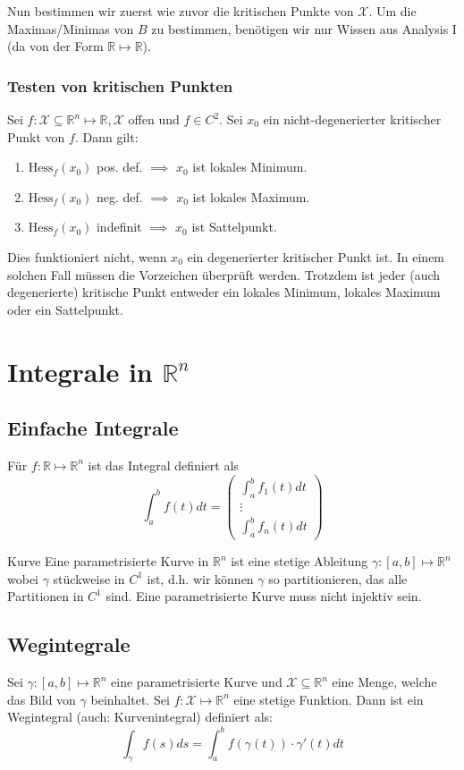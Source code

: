\documentclass[a4paper,10pt]{article}
\def\R{\mathbb{R}}
\def\X{\mathcal{X}}
\begin{document}
Nun bestimmen wir zuerst wie zuvor die kritischen Punkte von \(\X\). Um die Maximas/Minimas von \(B\) zu bestimmen, benötigen wir nur Wissen aus Analysis I (da von der Form \(\R \mapsto \R\)).
\subsubsection*{Testen von kritischen Punkten}
Sei \(f: \X \subseteq \R^n \mapsto \R, \X\) offen und \(f\in C^2\). Sei \(x_0\) ein nicht-degenerierter kritischer Punkt von \(f\). Dann gilt:
\begin{enumerate}
  \item $\text{Hess}_f(x_0)$ pos. def. \(\implies\) $x_0$ ist lokales Minimum.
  \item $\text{Hess}_f(x_0)$ neg. def. \(\implies\) $x_0$ ist lokales Maximum.
  \item $\text{Hess}_f(x_0)$ indefinit \(\implies\) $x_0$ ist Sattelpunkt.
\end{enumerate}
Dies funktioniert nicht, wenn \(x_0\) ein degenerierter kritischer Punkt ist. In einem solchen Fall müssen die Vorzeichen überprüft werden. Trotzdem ist jeder (auch degenerierte) kritische Punkt entweder ein lokales Minimum, lokales Maximum oder ein Sattelpunkt.

\section{Integrale in \texorpdfstring{\(\R^n\)}{Rⁿ}}
\subsection{Einfache Integrale}
Für \(f: \R \mapsto \R^n\) ist das Integral definiert als
\[\int_a^b f(t)dt = 
\begin{pmatrix*}
  \int_a^b f_1(t) dt \\
  \vdots\\
  \int_a^b f_n(t) dt
\end{pmatrix*}
\]

\begin{mainbox}{Kurve}
  Eine parametrisierte Kurve in \(\R^n\) ist eine stetige Ableitung \(\gamma: \left[a,b\right] \mapsto \R^n\) wobei \(\gamma\) stückweise in \(C^1\) ist, d.h. wir können \(\gamma\) so partitionieren, das alle Partitionen in \(C^1\) sind. Eine parametrisierte Kurve muss nicht injektiv sein.
\end{mainbox}
\subsection{Wegintegrale}
Sei \(\gamma : \left[a,b\right] \mapsto \R^n\) eine parametrisierte Kurve und \(\X \subseteq \R^n\) eine Menge, welche das Bild von \(\gamma\) beinhaltet. Sei \(f : \X \mapsto \R^n\) eine stetige Funktion. Dann ist ein Wegintegral (auch: Kurvenintegral) definiert als:
\[\int_\gamma f(s) ds = \int_a^b f(\gamma(t)) \cdot \gamma'(t) dt\]
\end{document}
